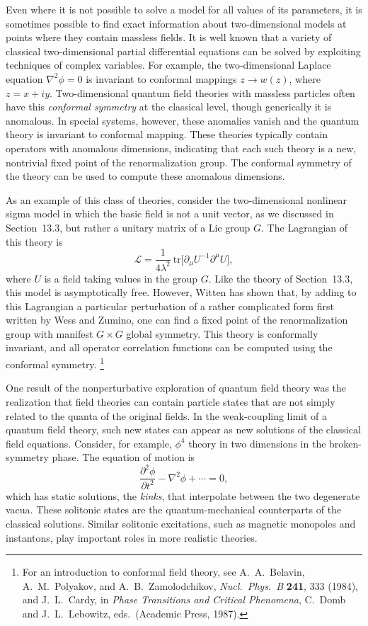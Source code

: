 Even where it is not possible to solve a model for all values of its
parameters, it is sometimes possible to find exact information about
two-dimensional models at points where they contain massless fields.  It is
well known that a variety of classical two-dimensional partial differential
equations can be solved by exploiting techniques of complex variables.  For
example, the two-dimensional Laplace equation $\nabla^2\phi = 0$ is
invariant to conformal mappings $z\to w(z)$, where $z = x + iy$.
Two-dimensional quantum field theories with massless particles often have
this \emph{conformal symmetry} at the classical level, though generically it
is anomalous.  In special systems, however, these anomalies vanish and the
quantum theory is invariant to conformal mapping.  These theories typically
contain operators with anomalous dimensions, indicating that each such theory
is a new, nontrivial fixed point of the renormalization group.  The conformal
symmetry of the theory can be used to compute these anomalous dimensions.

As an example of this class of theories, consider the two-dimensional
nonlinear sigma model in which the basic field is not a unit vector, as we
discussed in Section~13.3, but rather a unitary matrix of a Lie group $G$.
The Lagrangian of this theory is
\begin{equation}
  \mathcal{L} = \frac{1}{4\lambda^2}\ \mathrm{tr}\bigl[ \partial_\mu U^{-1}
    \partial^\mu U \bigr] ,
  \label{eq:22.17}
\end{equation}
where $U$ is a field taking values in the group $G$.  Like the theory of
Section~13.3, this model is asymptotically free.  However, Witten has shown
that, by adding to this Lagrangian a particular perturbation of a rather
complicated form first written by Wess and Zumino, one can find a fixed
point of the renormalization group with manifest $G\times G$ global
symmetry.  This theory is conformally invariant, and all operator correlation
functions can be computed using the conformal symmetry.%
\footnote{For an introduction to conformal field theory, see
A.~A.~Belavin, A.~M.~Polyakov, and A.~B.~Zamolodchikov,
\emph{Nucl.\ Phys.\ B} \textbf{241}, 333 (1984), and J.~L.~Cardy,
in \emph{Phase Transitions and Critical Phenomena}, C.~Domb and
J.~L.~Lebowitz, eds.\ (Academic Press, 1987).}

One result of the nonperturbative exploration of quantum field theory was the
realization that field theories can contain particle states that are not
simply related to the quanta of the original fields.  In the weak-coupling
limit of a quantum field theory, such new states can appear as new solutions
of the classical field equations.  Consider, for example, $\phi^4$ theory in
two dimensions in the broken-symmetry phase.  The equation of motion is
\begin{equation}
  \frac{\partial^2\phi}{\partial t^2} - \nabla^2\phi + \cdots = 0 ,
  \label{eq:22.18}
\end{equation}
which has static solutions, the \emph{kinks}, that interpolate between the
two degenerate vacua.  These solitonic states are the quantum-mechanical
counterparts of the classical solutions.  Similar solitonic excitations, such
as magnetic monopoles and instantons, play important roles in more realistic
theories.

